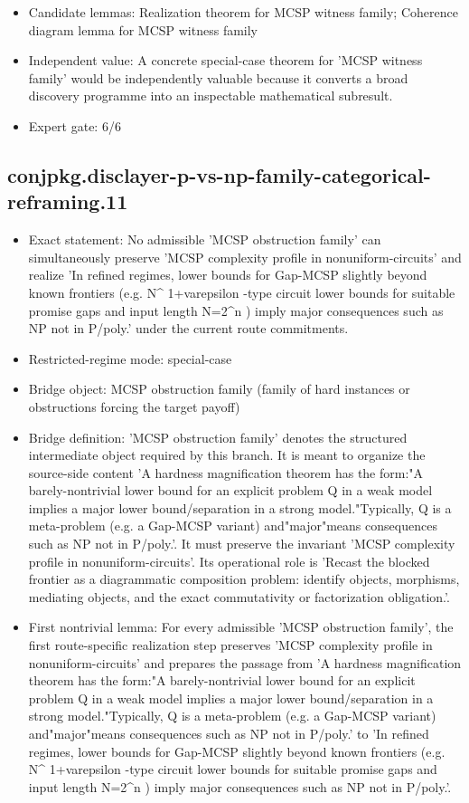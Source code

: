 \documentclass[11pt]{article}
\begin{document}
\begin{itemize}
\item Candidate lemmas: Realization theorem for MCSP witness family; Coherence diagram lemma for MCSP witness family
\item Independent value: A concrete special-case theorem for 'MCSP witness family' would be independently valuable because it converts a broad discovery programme into an inspectable mathematical subresult.
\item Expert gate: 6/6
\end{itemize}

\subsection*{conjpkg.disclayer-p-vs-np-family-categorical-reframing.11}
\begin{itemize}
\item Exact statement: No admissible 'MCSP obstruction family' can simultaneously preserve 'MCSP complexity profile in nonuniform-circuits' and realize 'In refined regimes, lower bounds for Gap-MCSP slightly beyond known frontiers (e.g. N\textasciicircum{} 1+varepsilon -type circuit lower bounds for suitable promise gaps and input length N=2\textasciicircum{}n ) imply major consequences such as NP not in P/poly.' under the current route commitments.
\item Restricted-regime mode: special-case
\item Bridge object: MCSP obstruction family (family of hard instances or obstructions forcing the target payoff)
\item Bridge definition: 'MCSP obstruction family' denotes the structured intermediate object required by this branch. It is meant to organize the source-side content 'A hardness magnification theorem has the form:"A barely-nontrivial lower bound for an explicit problem Q in a weak model implies a major lower bound/separation in a strong model."Typically, Q is a meta-problem (e.g. a Gap-MCSP variant) and"major"means consequences such as NP not in P/poly.'. It must preserve the invariant 'MCSP complexity profile in nonuniform-circuits'. Its operational role is 'Recast the blocked frontier as a diagrammatic composition problem: identify objects, morphisms, mediating objects, and the exact commutativity or factorization obligation.'.
\item First nontrivial lemma: For every admissible 'MCSP obstruction family', the first route-specific realization step preserves 'MCSP complexity profile in nonuniform-circuits' and prepares the passage from 'A hardness magnification theorem has the form:"A barely-nontrivial lower bound for an explicit problem Q in a weak model implies a major lower bound/separation in a strong model."Typically, Q is a meta-problem (e.g. a Gap-MCSP variant) and"major"means consequences such as NP not in P/poly.' to 'In refined regimes, lower bounds for Gap-MCSP slightly beyond known frontiers (e.g. N\textasciicircum{} 1+varepsilon -type circuit lower bounds for suitable promise gaps and input length N=2\textasciicircum{}n ) imply major consequences such as NP not in P/poly.'.

\end{itemize}
\end{document}
